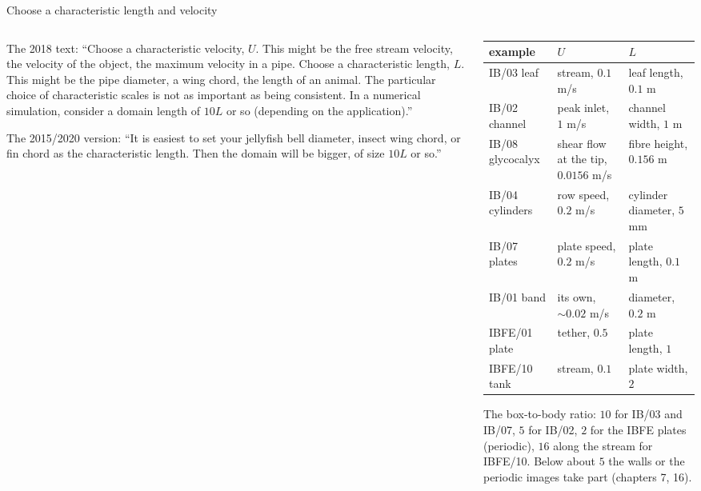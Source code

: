 \documentclass[aspectratio=169,11pt]{beamer}
\begin{document}
\begin{frame}{Choose a characteristic length and velocity}
\label{fr:scales}
\begin{columns}[T,onlytextwidth]
\begin{column}{0.5\textwidth}
\small The 2018 text: ``Choose a characteristic velocity, $U$. This might be the free stream velocity, the velocity of the object, the maximum velocity in a pipe. Choose a characteristic length, $L$. This might be the pipe diameter, a wing chord, the length of an animal. The particular choice of characteristic scales is not as important as being consistent. In a numerical simulation, consider a domain length of $10L$ or so (depending on the application).''
\vspace{1mm}

\small The 2015/2020 version: ``It is easiest to set your jellyfish bell diameter, insect wing chord, or fin chord as the characteristic length. Then the domain will be bigger, of size $10L$ or so.''
\end{column}
\begin{column}{0.48\textwidth}
\scriptsize
\begin{tabular}{@{}L{0.22\textwidth}L{0.32\textwidth}L{0.3\textwidth}@{}}
\toprule
example & $U$ & $L$\\
\midrule
IB/03 leaf & stream, $0.1$ m/s & leaf length, $0.1$ m\\
IB/02 channel & peak inlet, $1$ m/s & channel width, $1$ m\\
IB/08 glycocalyx & shear flow at the tip, $0.0156$ m/s & fibre height, $0.156$ m\\
IB/04 cylinders & row speed, $0.2$ m/s & cylinder diameter, $5$ mm\\
IB/07 plates & plate speed, $0.2$ m/s & plate length, $0.1$ m\\
IB/01 band & its own, $\sim0.02$ m/s & diameter, $0.2$ m\\
IBFE/01 plate & tether, $0.5$ & plate length, $1$\\
IBFE/10 tank & stream, $0.1$ & plate width, $2$\\
\bottomrule
\end{tabular}

\vspace{1mm}
\small The box-to-body ratio: $10$ for IB/03 and IB/07, $5$ for IB/02, $2$ for the IBFE plates (periodic), $16$ along the stream for IBFE/10. Below about $5$ the walls or the periodic images take part (chapters 7, 16).
\end{column}
\end{columns}
\end{frame}
\end{document}
